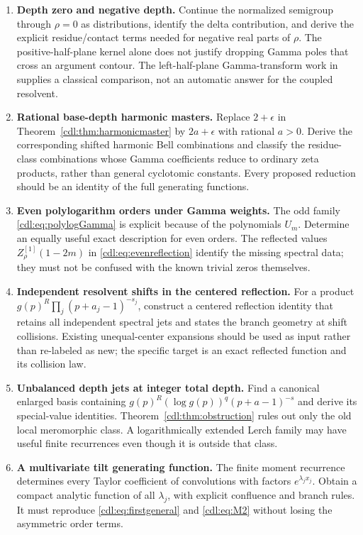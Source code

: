 \documentclass[11pt,letterpaper]{article}
\numberwithin{equation}{section}
\theoremstyle{definition}\newtheorem{definition}[theorem]{Definition}
\theoremstyle{remark}\newtheorem{remark}[theorem]{Remark}
\begin{document}
\begin{enumerate}[label=Q\arabic*.]
\item \textbf{Depth zero and negative depth.}
Continue the normalized semigroup through $\rho=0$ as distributions,
identify the delta contribution, and derive the explicit residue/contact
terms needed for negative real parts of $\rho$. The positive-half-plane
kernel alone does not justify dropping Gamma poles that cross an
argument contour. The left-half-plane Gamma-transform work in
\cite{CS} supplies a classical comparison, not an automatic answer for
the coupled resolvent.

\item \textbf{Rational base-depth harmonic masters.}
Replace $2+\epsilon$ in Theorem~\ref{cdl:thm:harmonicmaster} by
$2a+\epsilon$ with rational $a>0$. Derive the corresponding shifted
harmonic Bell combinations and classify the residue-class combinations
whose Gamma coefficients reduce to ordinary zeta products, rather than
general cyclotomic constants. Every proposed reduction should be an
identity of the full generating functions.

\item \textbf{Even polylogarithm orders under Gamma weights.}
The odd family \eqref{cdl:eq:polylogGamma} is explicit because of the
polynomials $U_m$. Determine an equally useful exact description for
even orders. The reflected values $Z_\rho^{[1]}(1-2m)$ in
\eqref{cdl:eq:evenreflection} identify the missing spectral data; they
must not be confused with the known trivial zeros themselves.

\item \textbf{Independent resolvent shifts in the centered reflection.}
For a product $g(p)^R\prod_j(p+a_j-1)^{-s_j}$, construct a centered
reflection identity that retains all independent spectral jets and
states the branch geometry at shift collisions. Existing unequal-center
expansions should be used as input rather than re-labeled as new;
the specific target is an exact reflected function and its collision law.

\item \textbf{Unbalanced depth jets at integer total depth.}
Find a canonical enlarged basis containing
$g(p)^R(\log g(p))^q(p+a-1)^{-s}$ and derive its special-value identities.
Theorem~\ref{cdl:thm:obstruction} rules out only the old local meromorphic
class. A logarithmically extended Lerch family may have useful finite
recurrences even though it is outside that class.

\item \textbf{A multivariate tilt generating function.}
The finite moment recurrence determines every Taylor coefficient of
convolutions with factors $e^{\lambda_jx_j}$. Obtain a compact analytic
function of all $\lambda_j$, with explicit confluence and branch rules.
It must reproduce \eqref{cdl:eq:firstgeneral} and \eqref{cdl:eq:M2}
without losing the asymmetric order terms.


\end{enumerate}
\end{document}
